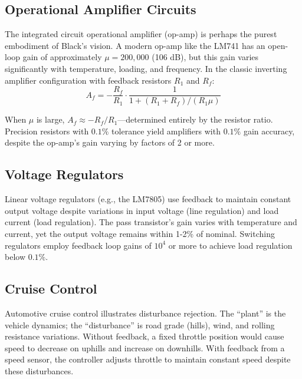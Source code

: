 \subsection{Operational Amplifier Circuits}

The integrated circuit operational amplifier (op-amp) is perhaps the purest embodiment of Black's vision. A modern op-amp like the LM741 has an open-loop gain of approximately $\mu = 200{,}000$ (106 dB), but this gain varies significantly with temperature, loading, and frequency. In the classic inverting amplifier configuration with feedback resistors $R_1$ and $R_f$:
\begin{equation}
A_f = -\frac{R_f}{R_1} \cdot \frac{1}{1 + (R_1 + R_f)/(R_1 \mu)}
\end{equation}

When $\mu$ is large, $A_f \approx -R_f/R_1$---determined entirely by the resistor ratio. Precision resistors with $0.1\%$ tolerance yield amplifiers with $0.1\%$ gain accuracy, despite the op-amp's gain varying by factors of 2 or more.

\subsection{Voltage Regulators}

Linear voltage regulators (e.g., the LM7805) use feedback to maintain constant output voltage despite variations in input voltage (line regulation) and load current (load regulation). The pass transistor's gain varies with temperature and current, yet the output voltage remains within 1-2\% of nominal. Switching regulators employ feedback loop gains of $10^4$ or more to achieve load regulation below $0.1\%$.

\subsection{Cruise Control}

Automotive cruise control illustrates disturbance rejection. The ``plant'' is the vehicle dynamics; the ``disturbance'' is road grade (hills), wind, and rolling resistance variations. Without feedback, a fixed throttle position would cause speed to decrease on uphills and increase on downhills. With feedback from a speed sensor, the controller adjusts throttle to maintain constant speed despite these disturbances.

